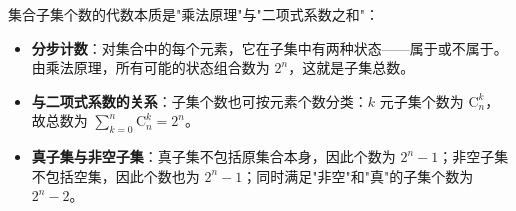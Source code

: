 \begin{explanationbox}
集合子集个数的代数本质是"乘法原理"与"二项式系数之和"：
\begin{itemize}
    \item \textbf{分步计数}：对集合中的每个元素，它在子集中有两种状态——属于或不属于。由乘法原理，所有可能的状态组合数为 $2^n$，这就是子集总数。
    \item \textbf{与二项式系数的关系}：子集个数也可按元素个数分类：$k$ 元子集个数为 $\mathrm{C}_n^k$，故总数为 $\sum_{k=0}^n \mathrm{C}_n^k = 2^n$。
    \item \textbf{真子集与非空子集}：真子集不包括原集合本身，因此个数为 $2^n-1$；非空子集不包括空集，因此个数也为 $2^n-1$；同时满足"非空"和"真"的子集个数为 $2^n-2$。
\end{itemize}
\end{explanationbox}